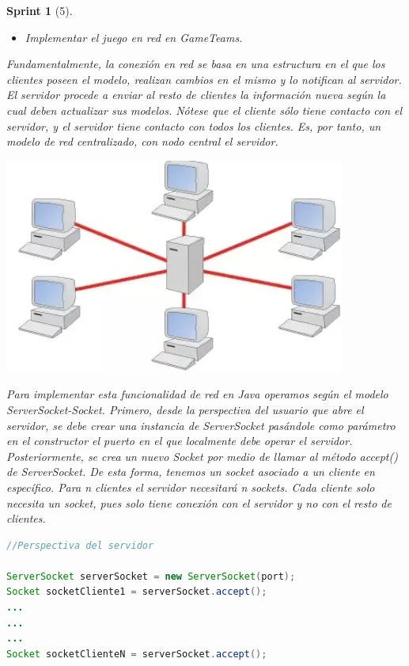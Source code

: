 \documentclass{article}
\theoremstyle{break}
\newtheorem*{sprint}{Sprint}
\begin{document}
\begin{sprint}[5]
\begin{itemize}
\item Implementar el juego en red en GameTeams.
\end{itemize}

Fundamentalmente, la conexión en red se basa en una estructura en el que los clientes poseen el modelo, realizan cambios en el mismo y lo notifican al servidor. El servidor procede a enviar al resto de clientes la información nueva según la cual deben actualizar sus modelos. Nótese que el cliente sólo tiene contacto con el servidor, y el servidor tiene contacto con todos los clientes. Es, por tanto, un modelo de red centralizado, con nodo central el servidor.

\begin{center}
\includegraphics[scale=1]{redCentralizada.png} 
\end{center}

Para implementar esta funcionalidad de red en Java operamos según el modelo ServerSocket-Socket. Primero, desde la perspectiva del usuario que abre el servidor, se debe crear una instancia de ServerSocket pasándole como parámetro en el constructor el puerto en el que localmente debe operar el servidor. Posteriormente, se crea un nuevo Socket por medio de llamar al método accept() de ServerSocket. De esta forma, tenemos un socket asociado a un cliente en específico. Para n clientes el servidor necesitará n sockets. Cada cliente solo necesita un socket, pues solo tiene conexión con el servidor y no con el resto de clientes.

\begin{lstlisting}[frame=single, language=Java]
//Perspectiva del servidor

ServerSocket serverSocket = new ServerSocket(port);
Socket socketCliente1 = serverSocket.accept();
...
...
...
Socket socketClienteN = serverSocket.accept();

\end{lstlisting}



\end{sprint}
\end{document}
